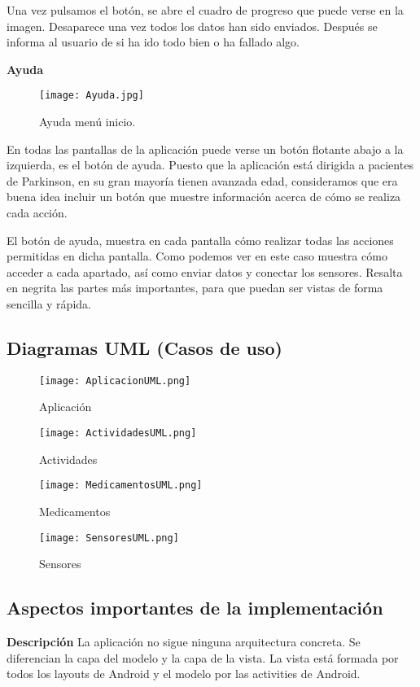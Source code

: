 \documentclass[11pt,spanish]{article}
\begin{document}
Una vez pulsamos el botón, se abre el cuadro de progreso que puede verse en la imagen. Desaparece una vez todos los datos han sido enviados. Después se informa al usuario de si ha ido todo bien o ha fallado algo.
\newline
\newpage

{\bf Ayuda}
\begin{figure}[h!]
\centering
\texttt{[image: Ayuda.jpg]}
\caption{Ayuda menú inicio.}
\end{figure}

En todas las pantallas de la aplicación puede verse un botón flotante abajo a la izquierda, es el botón de ayuda. Puesto que la aplicación está dirigida a pacientes de Parkinson, en su gran mayoría tienen avanzada edad, consideramos que era buena idea incluir un botón que muestre información acerca de cómo se realiza cada acción.
\newline

El botón de ayuda, muestra en cada pantalla cómo realizar todas las acciones permitidas en dicha pantalla. Como podemos ver en este caso muestra cómo acceder a cada apartado, así como enviar datos y conectar los sensores. Resalta en negrita las partes más importantes, para que puedan ser vistas de forma sencilla y rápida.
\newpage

\subsection{Diagramas UML (Casos de uso)}
\begin{figure}[!htb]
  \texttt{[image: AplicacionUML.png]}
  \caption{Aplicación}
\endminipage\hfill
{}
  \texttt{[image: ActividadesUML.png]}
  \caption{Actividades}
\endminipage\hfill
\end{figure}

\begin{figure}[!htb]
%
  \texttt{[image: MedicamentosUML.png]}
  \caption{Medicamentos}
\endminipage
{}%
  \texttt{[image: SensoresUML.png]}
  \caption{Sensores}
\endminipage
\end{figure}
\newpage

\subsection{Aspectos importantes de la implementación}
{\bf Descripción}
\newline
\newline
La aplicación no sigue ninguna arquitectura concreta. Se diferencian la capa del modelo y la capa de la vista. La vista está formada por todos los layouts de Android y el modelo por las activities de Android.
\newline
\end{document}

